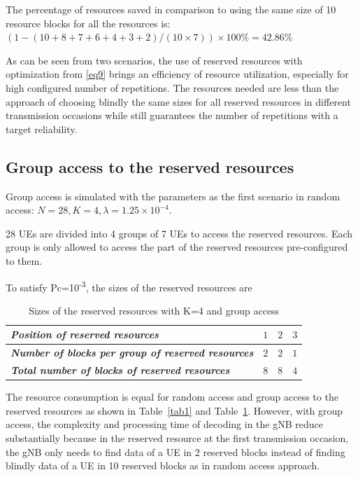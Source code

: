 \documentclass[conference]{IEEEtran}
\begin{document}
The percentage of resources saved in comparison to using the same size of 10 resource blocks for all the resources is: $(1 - (10+8+7+6+4+3+2)/(10\times7)) \times100\% = 42.86\%$

As can be seen from two scenarios, the use of reserved resources with optimization from \eqref{eq9} brings an efficiency of resource utilization, especially for high configured number of repetitions. The resources needed are less than the approach of choosing blindly the same sizes for all reserved resources in different transmission occasions while still guarantees the number of repetitions with a target reliability.

\subsection{Group access to the reserved resources}\label{IIIBB}
Group access is simulated with the parameters as the first scenario in random access: $N = 28, K = 4, \lambda = 1.25\times10^{-4}$.

28 UEs are divided into 4 groups of 7 UEs to access the reserved resources. Each group is only allowed to access the part of the reserved resources pre-configured to them. 

To satisfy Pc=10\textsuperscript{-3}, the sizes of the reserved resources are

\begin{table}[htbp]
\caption{Sizes of the reserved resources with K=4 and group access}
\begin{center}
\begin{tabular}{|p{14em}|p{2em}|p{2em}|p{2em}|}
 \hline
 \textbf{\textit{Position of reserved resources}} & $1$ &$2$ &$3$ \\ 
 \hline
 \textbf{\textit{Number of blocks per group of reserved resources}} & $2$ &$2$ &$1$ \\
 \hline
\textbf{\textit{Total number of blocks of reserved resources}} & $8$ &$8$ &$4$ \\
 
 \hline
\end{tabular}
\label{tab3}
\end{center}
\end{table}

The resource consumption is equal for random access and group access to the reserved resources as shown in Table~\ref{tab1} and Table~\ref{tab3}. However, with group access, the complexity and processing time of decoding in the gNB reduce substantially because in the reserved resource at the first transmission occasion, the gNB only needs to find data of a UE in 2 reserved blocks instead of finding blindly data of a UE in 10 reserved blocks as in random access approach.
\end{document}
